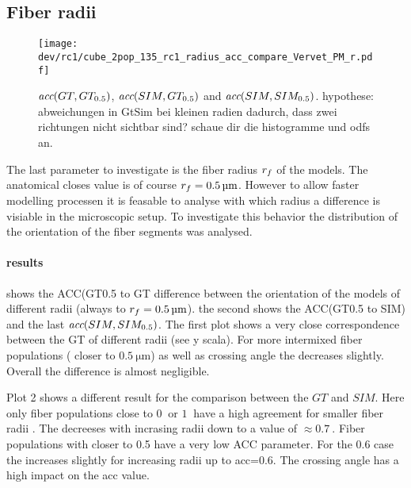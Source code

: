\subsection{Fiber radii}
% 
\begin{figure}[!t]
\centering
\texttt{[image: dev/rc1/cube\_2pop\_135\_rc1\_radius\_acc\_compare\_Vervet\_PM\_r.pdf]}
\caption[sim acc]{ $\textit{acc}{}(GT,GT_{0.5})$, $\textit{acc}{}(SIM,GT_{0.5})$ and $\textit{acc}{}(SIM,SIM_{0.5})$. hypothese: abweichungen in GtSim bei kleinen radien dadurch, dass zwei richtungen nicht sichtbar sind? schaue dir die histogramme und odfs an. }
\label{fig:accVervetPMr}
\end{figure}
% 
The last parameter to investigate is the fiber radius $\textnormal{$r_f$}{}$ of the models.
The anatomical closes value is of course $\fiberRadius{} = \SI{0.5}{\micro\meter}$.
However to allow faster modelling processen it is feasable to analyse with which radius a difference is visiable in the microscopic setup.
To investigate this behavior the distribution of the orientation of the fiber segments was analysed.
\par
% 
\paragraph{results}
 shows the ACC(GT0.5 to GT difference between the orientation of the models of different radii (always to $\fiberRadius{} = \SI{0.5}{\micro\meter}$).
the second shows the ACC(GT0.5 to SIM) and the last $\textit{acc}{}(SIM,SIM_{0.5})$.
% 
The first plot shows a very close correspondence between the GT of different radii (see y scala).
For more intermixed fiber populations (\modelPsi{} closer to $\SI{0.5}{\micro\meter}$) as well as crossing angle \modelOmega{} the \acc{} decreases slightly.
Overall the difference is almost negligible.
\par
%
Plot 2 shows a different result for the comparison between the $GT$ and $SIM$.
Here only fiber populations \modelPsi{} close to $\SI{0}{}$ or $\SI{1}{}$ have a high agreement for smaller fiber radii \fiberRadius{}.
The \acc{} decreeses with incrasing radii \fiberRadius{} down to a value of $\approx \SI{0.7}{}$.
Fiber populations with \modelPsi{} closer to 0.5 have a very low ACC parameter. For the 0.6 case the \acc{} increases slightly for increasing radii up to acc=0.6.
The crossing angle has a high impact on the acc value. 
% 
